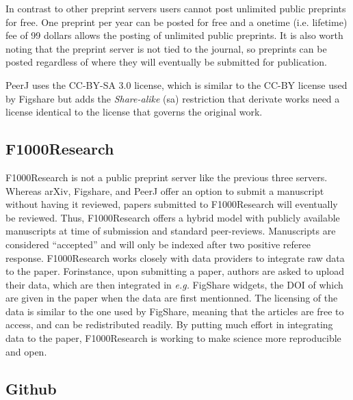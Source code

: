 \documentclass[letterpaper,twocolumn,superscriptaddress,showkeys,longbibliography]{revtex4-1}
\begin{document}
In contrast to other preprint servers users cannot post unlimited public
preprints for free. One preprint per year can be posted for free and a onetime
(i.e. lifetime) fee of 99 dollars allows the posting of unlimited public
preprints. It is also worth noting that the preprint server is not tied to the
journal, so preprints can be posted regardless of where they will eventually be
submitted for publication.

PeerJ uses the CC-BY-SA 3.0 license, which is similar to the CC-BY license used
by Figshare but adds the \emph{Share-alike} (sa) restriction that derivate works
need a license identical to the license that governs the original work.

\subsection{F1000Research}

F1000Research is not a public preprint server like the previous three servers.
Whereas arXiv, Figshare, and PeerJ offer an option to submit a manuscript
without having it reviewed, papers submitted to F1000Research will eventually
be reviewed. Thus, F1000Research offers a hybrid model with publicly available
manuscripts at time of submission and standard peer-reviews. Manuscripts are
considered ``accepted'' and will only be indexed after two positive referee
response. F1000Research works closely with data providers to integrate raw
data to the paper. Forinstance, upon submitting a paper, authors are asked to
upload their data, which are then integrated in \emph{e.g.} FigShare widgets,
the DOI of which are given in the paper when the data are first mentionned.
The licensing of the data is similar to the one used by FigShare, meaning that
the articles are free to access, and can be redistributed readily. By putting
much effort in integrating data to the paper, F1000Research is working to make
science more reproducible and open.

\subsection{Github}
\end{document}
